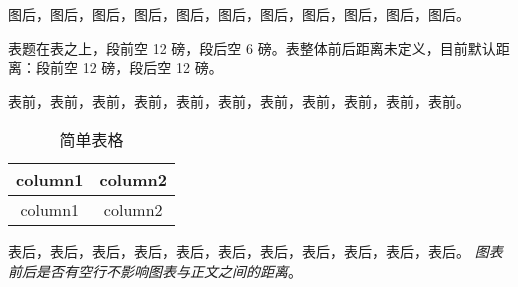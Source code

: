 图后，图后，图后，图后，图后，图后，图后，图后，图后，图后，图后。

表题在表之上，段前空 12 磅，段后空 6 磅。表整体前后距离未定义，目前默认距离：段前空 12 磅，段后空 12 磅。

表前，表前，表前，表前，表前，表前，表前，表前，表前，表前，表前。

\begin{table}[htbp]
  \centering
  \caption{简单表格}
    \begin{tabular}{cc}
    \toprule
    column1 & column2\\
    \midrule
    column1 & column2\\
    \bottomrule
    \end{tabular}
  \label{label}
\end{table}

表后，表后，表后，表后，表后，表后，表后，表后，表后，表后，表后。
\emph{图表前后是否有空行不影响图表与正文之间的距离}。
